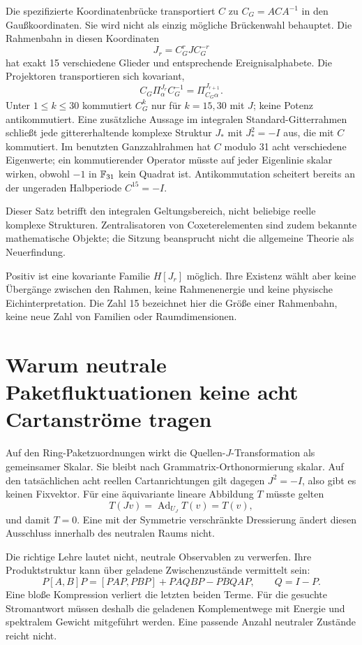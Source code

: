 Die spezifizierte Koordinatenbrücke transportiert $C$ zu $C_G=ACA^{-1}$ in den Gaußkoordinaten. Sie wird nicht als einzig mögliche Brückenwahl behauptet. Die Rahmenbahn in diesen Koordinaten
\[
 J_r=C_G^rJC_G^{-r}
\]
hat exakt 15 verschiedene Glieder und entsprechende Ereignisalphabete. Die Projektoren transportieren sich kovariant,
\[
 C_G\Pi_\alpha^{J_r}C_G^{-1}=\Pi_{C_G\alpha}^{J_{r+1}}.
\]
Unter $1\le k\le30$ kommutiert $C_G^k$ nur für $k=15,30$ mit $J$; keine Potenz antikommutiert. Eine zusätzliche Aussage im integralen Standard-Gitterrahmen schließt jede gittererhaltende komplexe Struktur $J_*$ mit $J_*^2=-I$ aus, die mit $C$ kommutiert. Im benutzten Ganzzahlrahmen hat $C$ modulo 31 acht verschiedene Eigenwerte; ein kommutierender Operator müsste auf jeder Eigenlinie skalar wirken, obwohl $-1$ in $\mathbb F_{31}$ kein Quadrat ist. Antikommutation scheitert bereits an der ungeraden Halbperiode $C^{15}=-I$. 

Dieser Satz betrifft den integralen Geltungsbereich, nicht beliebige reelle komplexe Strukturen. Zentralisatoren von Coxeterelementen sind zudem bekannte mathematische Objekte; die Sitzung beansprucht nicht die allgemeine Theorie als Neuerfindung. \cite{coxeter}

Positiv ist eine kovariante Familie $H[J_r]$ möglich. Ihre Existenz wählt aber keine Übergänge zwischen den Rahmen, keine Rahmenenergie und keine physische Eichinterpretation. Die Zahl 15 bezeichnet hier die Größe einer Rahmenbahn, keine neue Zahl von Familien oder Raumdimensionen.

\section{Warum neutrale Paketfluktuationen keine acht Cartanströme tragen}
Auf den Ring-Paketzuordnungen wirkt die Quellen-$J$-Transformation als gemeinsamer Skalar. Sie bleibt nach Grammatrix-Orthonormierung skalar. Auf den tatsächlichen acht reellen Cartanrichtungen gilt dagegen $J^2=-I$, also gibt es keinen Fixvektor. Für eine äquivariante lineare Abbildung $T$ müsste gelten
\[
 T(Jv)=\operatorname{Ad}_{U_J}T(v)=T(v),
\]
und damit $T=0$. Eine mit der Symmetrie verschränkte Dressierung ändert diesen Ausschluss innerhalb des neutralen Raums nicht. 

Die richtige Lehre lautet nicht, neutrale Observablen zu verwerfen. Ihre Produktstruktur kann über geladene Zwischenzustände vermittelt sein:
\[
 P[A,B]P=[PAP,PBP]+PAQBP-PBQAP,\qquad Q=I-P.
\]
Eine bloße Kompression verliert die letzten beiden Terme. Für die gesuchte Stromantwort müssen deshalb die geladenen Komplementwege mit Energie und spektralem Gewicht mitgeführt werden. Eine passende Anzahl neutraler Zustände reicht nicht.

